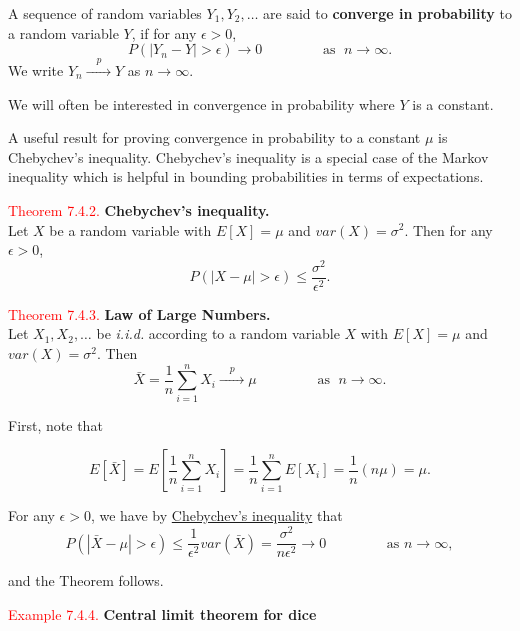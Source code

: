 \documentclass[
]{book}
\begin{document}
A sequence of random variables \(Y_1, Y_2, \ldots\) are said to \textbf{converge in probability} to a random variable \(Y\), if for any \(\epsilon >0\),
\[ P(|Y_n - Y|> \epsilon) \to 0 \qquad \qquad \mbox{ as } \; n \to \infty. \] We write \(Y_n \xrightarrow{\quad p \quad} Y\) as \(n \to \infty\).

We will often be interested in convergence in probability where \(Y\) is a constant.

A useful result for proving convergence in probability to a constant \(\mu\) is Chebychev's inequality. Chebychev's inequality is a special case of the Markov inequality which is helpful in bounding probabilities in terms of expectations.

\leavevmode{}%
\textcolor{red}{Theorem 7.4.2.}
{\textbf{Chebychev's inequality.}}\\
Let \(X\) be a random variable with \(E[X] =\mu\) and \(var(X)=\sigma^2\). Then for any \(\epsilon >0\),
\[ P(|X - \mu| > \epsilon) \leq \frac{\sigma^2}{\epsilon^2}. \]

\leavevmode{}%
\textcolor{red}{Theorem 7.4.3.}
{\textbf{Law of Large Numbers.}}\\
Let \(X_1, X_2, \ldots\) be \emph{i.i.d.} according to a random variable \(X\) with \(E[X] = \mu\) and \(var(X) =\sigma^2\). Then
\[\bar{X} = \frac{1}{n} \sum_{i=1}^n X_i \xrightarrow{\quad p \quad} \mu \qquad \qquad \mbox{ as } \; n \to \infty. \]

First, note that

\[E[\bar{X}] = E \left[ \frac{1}{n} \sum_{i=1}^n X_i \right]= \frac{1}{n} \sum_{i=1}^n E \left[ X_i \right] = \frac{1}{n} (n \mu) = \mu.\]

For any \(\epsilon >0\), we have by \protect\hyperlink{Sec_CLT:thm:Cheby}{Chebychev's inequality} that\\

\[ P(|\bar{X}- \mu| > \epsilon) \leq \frac{1}{\epsilon^2} var (\bar{X}) = \frac{\sigma^2}{n \epsilon^2} \to 0 \qquad \qquad \mbox{ as } n \to \infty, \]

and the Theorem follows.

\leavevmode{}%
\textcolor{red}{Example 7.4.4.}
{\textbf{Central limit theorem for dice}}
\end{document}
